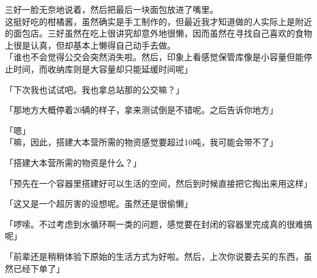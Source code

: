 三好一脸无奈地说着，然后把最后一块面包放进了嘴里。\\

这挺好吃的柑橘酱，虽然确实是手工制作的，但最近我才知道做的人实际上是附近的面包店。三好虽然在吃上很讲究却意外地很懒，因而虽然在寻找自己喜欢的食物上很是认真，但却基本上懒得自己动手去做。\\

「谁也不会觉得公交会突然消失啦。然后，印象上看感觉保管库像是小容量但能停止时间，而收纳库则是大容量却只能延缓时间呢」

「下次我也试试吧。我也拿总站那的公交嘛？」

「那地方大概停着20辆的样子，拿来测试倒是不错呢。之后告诉你地方」

「嗯」\\

「嘛，因此，搭建大本营所需的物资感觉要超过10吨，我可能会带不了」

「搭建大本营所需的物资是什么？」

「预先在一个容器里搭建好可以生活的空间，然后到时候直接把它掏出来用这样」

「这又是一个超厉害的设想呢。虽然还是很偷懒」

「啰嗦。不过考虑到水循环啊一类的问题，感觉要在封闭的容器里完成真的很难搞呢」

「前辈还是稍稍体验下原始的生活方式为好啦。然后，上次你说要去买的东西，虽然已经下单了」\\

